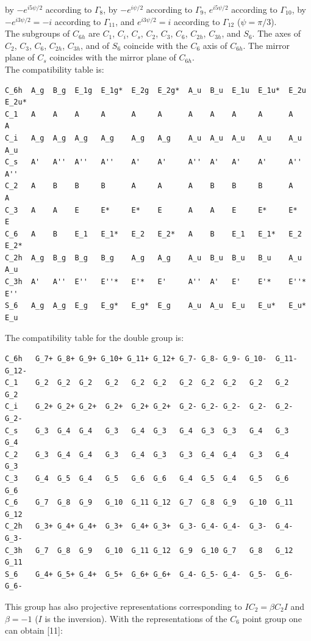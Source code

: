 \documentclass[12pt,a4paper]{article}
\begin{document}
by $-e^{i5\psi/2}$ according to $\Gamma_8$, by $-e^{i\psi/2}$ according 
to $\Gamma_9$, $e^{i5\psi/2}$ according to $\Gamma_{10}$, by $-e^{i3\psi/2}=-i$ 
according to $\Gamma_{11}$, and $e^{i3\psi/2}=i$ according 
to $\Gamma_{12}$ ($\psi=\pi/3$). \\
The subgroups of $C_{6h}$ are $C_1$, $C_i$, $C_s$, $C_2$, $C_3$, $C_6$, 
$C_{2h}$, $C_{3h}$, and $S_6$. The axes of $C_2$, $C_3$, $C_6$, $C_{2h}$, 
$C_{3h}$, and of $S_6$ coincide with the $C_6$ axis of $C_{6h}$. The mirror 
plane of $C_s$ coincides with the mirror plane of $C_{6h}$.\\
The compatibility table is:
\begin{verbatim}
C_6h  A_g  B_g  E_1g  E_1g*  E_2g  E_2g*  A_u  B_u  E_1u  E_1u*  E_2u  E_2u*
C_1   A    A    A     A      A     A      A    A    A     A      A     A
C_i   A_g  A_g  A_g   A_g    A_g   A_g    A_u  A_u  A_u   A_u    A_u   A_u
C_s   A'   A''  A''   A''    A'    A'     A''  A'   A'    A'     A''   A''
C_2   A    B    B     B      A     A      A    B    B     B      A     A
C_3   A    A    E     E*     E*    E      A    A    E     E*     E*    E
C_6   A    B    E_1   E_1*   E_2   E_2*   A    B    E_1   E_1*   E_2   E_2*
C_2h  A_g  B_g  B_g   B_g    A_g   A_g    A_u  B_u  B_u   B_u    A_u   A_u
C_3h  A'   A''  E''   E''*   E'*   E'     A''  A'   E'    E'*    E''*  E'' 
S_6   A_g  A_g  E_g   E_g*   E_g*  E_g    A_u  A_u  E_u   E_u*   E_u*  E_u
\end{verbatim}
The compatibility table for the double group is:
\begin{verbatim}
C_6h   G_7+ G_8+ G_9+ G_10+ G_11+ G_12+ G_7- G_8- G_9- G_10-  G_11- G_12-
C_1    G_2  G_2  G_2   G_2   G_2  G_2   G_2  G_2  G_2   G_2   G_2   G_2
C_i    G_2+ G_2+ G_2+  G_2+  G_2+ G_2+  G_2- G_2- G_2-  G_2-  G_2-  G_2-  
C_s    G_3  G_4  G_4   G_3   G_4  G_3   G_4  G_3  G_3   G_4   G_3   G_4
C_2    G_3  G_4  G_4   G_3   G_4  G_3   G_3  G_4  G_4   G_3   G_4   G_3    
C_3    G_4  G_5  G_4   G_5   G_6  G_6   G_4  G_5  G_4   G_5   G_6   G_6  
C_6    G_7  G_8  G_9   G_10  G_11 G_12  G_7  G_8  G_9   G_10  G_11  G_12 
C_2h   G_3+ G_4+ G_4+  G_3+  G_4+ G_3+  G_3- G_4- G_4-  G_3-  G_4-  G_3-   
C_3h   G_7  G_8  G_9   G_10  G_11 G_12  G_9  G_10 G_7   G_8   G_12  G_11 
S_6    G_4+ G_5+ G_4+  G_5+  G_6+ G_6+  G_4- G_5- G_4-  G_5-  G_6-  G_6-
\end{verbatim}
This group has also projective representations corresponding to
$IC_2 = \beta C_2 I$ and $\beta=-1$ ($I$ is the inversion).
With the representations of the $C_6$ point group one can obtain [11]:
\end{document}
